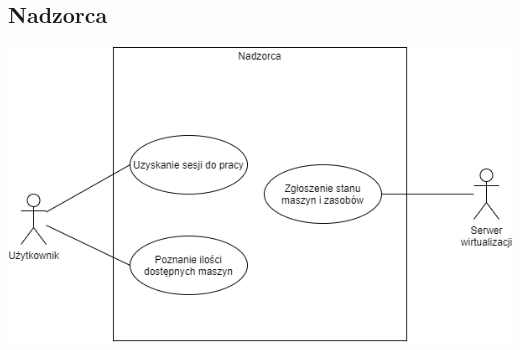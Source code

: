 \documentclass[12pt]{article}
\begin{document}
\subsection{Nadzorca}
\includegraphics[width=\textwidth]{../diagrams/use_cases/overseer.png}
\end{document}
